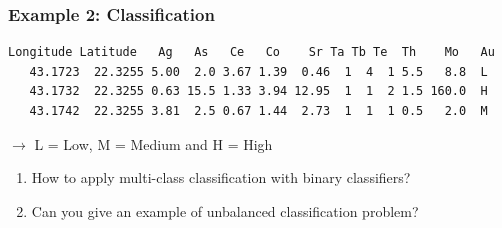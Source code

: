 \documentclass[14pt, handout]{beamer}
\begin{document}
\begin{frame}[fragile]\frametitle{Example 2: Classification}
	
{\scriptsize
\begin{verbatim}
Longitude Latitude   Ag   As   Ce   Co    Sr Ta Tb Te  Th    Mo   Au
   43.1723  22.3255 5.00  2.0 3.67 1.39  0.46  1  4  1 5.5   8.8  L
   43.1732  22.3255 0.63 15.5 1.33 3.94 12.95  1  1  2 1.5 160.0  H
   43.1742  22.3255 3.81  2.5 0.67 1.44  2.73  1  1  1 0.5   2.0  M
\end{verbatim}
}
\centerline{$\rightarrow$ L = Low, M = Medium and H = High}


\begin{enumerate}
\item How to apply multi-class classification with binary classifiers?
\item Can you give an example of unbalanced classification problem?
\end{enumerate}

\end{frame}
\end{document}
